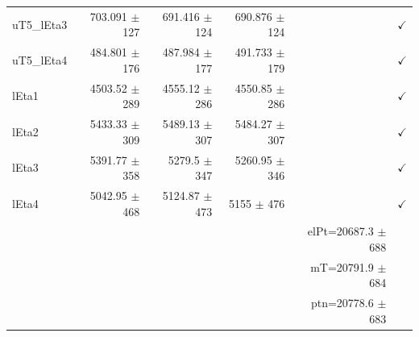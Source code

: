 \begin{table}[htbp]
\begin{tabular}{lrrrrr}
uT5\_lEta3 & 703.091 $\pm$ 127 & 691.416 $\pm$ 124 & 690.876 $\pm$ 124 &  & $\checkmark$ \\
uT5\_lEta4 & 484.801 $\pm$ 176 & 487.984 $\pm$ 177 & 491.733 $\pm$ 179 &  & $\checkmark$ \\
\hline
lEta1 & 4503.52 $\pm$ 289 & 4555.12 $\pm$ 286 & 4550.85 $\pm$ 286 &  & $\checkmark$ \\
lEta2 & 5433.33 $\pm$ 309 & 5489.13 $\pm$ 307 & 5484.27 $\pm$ 307 &  & $\checkmark$ \\
lEta3 & 5391.77 $\pm$ 358 & 5279.5 $\pm$ 347 & 5260.95 $\pm$ 346 &  & $\checkmark$ \\
lEta4 & 5042.95 $\pm$ 468 & 5124.87 $\pm$ 473 & 5155 $\pm$ 476 &  & $\checkmark$ \\
\hline
 &  &  &  & elPt=20687.3 $\pm$ 688 &  \\
 &  &  &  & mT=20791.9 $\pm$ 684 &  \\
 &  &  &  & ptn=20778.6 $\pm$ 683 &  \\
\hline
\end{tabular}
\end{table}